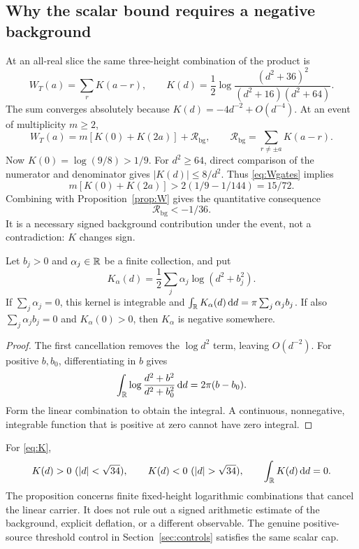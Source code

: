 \subsection{Why the scalar bound requires a negative background}

At an all-real slice the same three-height combination of the product is
\begin{equation}\label{eq:K}
 W_T(a)=\sum_r K(a-r),\qquad
 K(d)=\frac12\log\frac{(d^2+36)^2}{(d^2+16)(d^2+64)}.
\end{equation}
The sum converges absolutely because \(K(d)=-4d^{-2}+O(d^{-4})\).
At an event of multiplicity \(m\ge2\),
\begin{equation}
 W_T(a)=m[K(0)+K(2a)]+\mathcal R_{\mathrm{bg}},\qquad
 \mathcal R_{\mathrm{bg}}=\sum_{r\ne\pm a}K(a-r).
 \label{eq:Wbackground}
\end{equation}
Now \(K(0)=\log(9/8)>1/9\). For \(d^2\ge64\), direct comparison of
the numerator and denominator gives \(|K(d)|\le8/d^2\).
Thus \eqref{eq:Wgates} implies
\[
 m[K(0)+K(2a)]>2(1/9-1/144)=15/72.
\]
Combining with Proposition~\ref{prop:W} gives the quantitative consequence
\begin{equation}\label{eq:bgnegative}
 \boxed{\mathcal R_{\mathrm{bg}}<-1/36.}
\end{equation}
It is a necessary signed background contribution under the event,
not a contradiction: \(K\) changes sign.

\begin{proposition}
\label{prop:kernel}
Let \(b_j>0\) and \(\alpha_j\in\mathbb R\) be a finite collection, and put
\[
 K_\alpha(d)=\frac12\sum_j\alpha_j\log(d^2+b_j^2).
\]
If \(\sum_j\alpha_j=0\), this kernel is integrable and
\(\int_\mathbb R K_\alpha(d)\,\mathrm d d=\pi\sum_j\alpha_j b_j\).
If also \(\sum_j\alpha_j b_j=0\) and \(K_\alpha(0)>0\), then
\(K_\alpha\) is negative somewhere.
\end{proposition}
\begin{proof}
The first cancellation removes the \(\log d^2\) term, leaving
\(O(d^{-2})\). For positive \(b,b_0\), differentiating in \(b\) gives
\[
 \int_\mathbb R\log\frac{d^2+b^2}{d^2+b_0^2}\,\mathrm d d=2\pi(b-b_0).
\]
Form the linear combination to obtain the integral. A continuous,
nonnegative, integrable function that is positive at zero cannot have
zero integral.
\end{proof}

For \eqref{eq:K},
\[
 K(d)>0\ (|d|<\sqrt{34}),\qquad
 K(d)<0\ (|d|>\sqrt{34}),\qquad \int_\R K(d)\dd d=0.
\]
The proposition concerns finite fixed-height logarithmic combinations
that cancel the linear carrier. It does not rule out a signed arithmetic
estimate of the background, explicit deflation, or a different observable.
The genuine positive-source threshold control in
Section~\ref{sec:controls} satisfies the same scalar cap.

